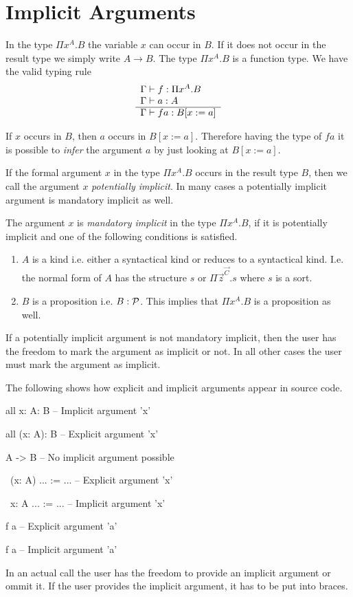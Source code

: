 \section{Implicit Arguments}


In the type $\Pi x^A. B$ the variable $x$ can occur in $B$. If it does not occur
in the result type we simply write $A \to B$. The type $\Pi x^A. B$ is a
function type. We have the valid typing rule
$$
\rulev{
    \Gamma \vdash f: \Pi x^A. B

    \\

    \Gamma \vdash a: A
}
{
    \Gamma \vdash f a: B[x:= a]
}
$$

If $x$ occurs in $B$, then $a$ occurs in $B[x:=a]$. Therefore having the type of
$f a$ it is possible to \emph{infer} the argument $a$ by just looking at
$B[x:=a]$.


If the formal argument $x$ in the type $\Pi x^A. B$ occurs in the result type
$B$, then we call the argument $x$ \emph{potentially implicit}. In many cases a
potentially implicit argument is mandatory implicit as well.

The argument $x$ is \emph{mandatory implicit} in the type $\Pi x^A. B$, if it is
potentially implicit and one of the following conditions is satisfied.

\begin{enumerate}

\item
    $A$ is a kind i.e. either a syntactical kind or reduces to a syntactical
        kind. I.e. the normal form of $A$ has the structure $s$ or $\Pi
        \vec{z}^\vec{C}.  s$ where $s$ is a sort.


\item
    $B$ is a proposition i.e. $B: {\cal{P}}$. This implies that $\Pi x^A. B$ is a
        proposition as well.

\end{enumerate}


If a potentially implicit argument is not mandatory implicit, then the user has
the freedom to mark the argument as implicit or not. In all other cases the user
must mark the argument as implicit.

The following shows how explicit and implicit arguments appear in source code.


\begin{alba}
    all {x: A}: B               -- Implicit argument 'x'

    all (x: A): B               -- Explicit argument 'x'

    A -> B                      -- No implicit argument possible


    \ (x: A) ... := ...         -- Explicit argument 'x'

    \ {x: A} ... := ...         -- Implicit argument 'x'


    f a                         -- Explicit argument 'a'

    f {a}                       -- Implicit argument 'a'
\end{alba}
%
In an actual call the user has the freedom to provide an implicit argument or
ommit it. If the user provides the implicit argument, it has to be put into
braces.


